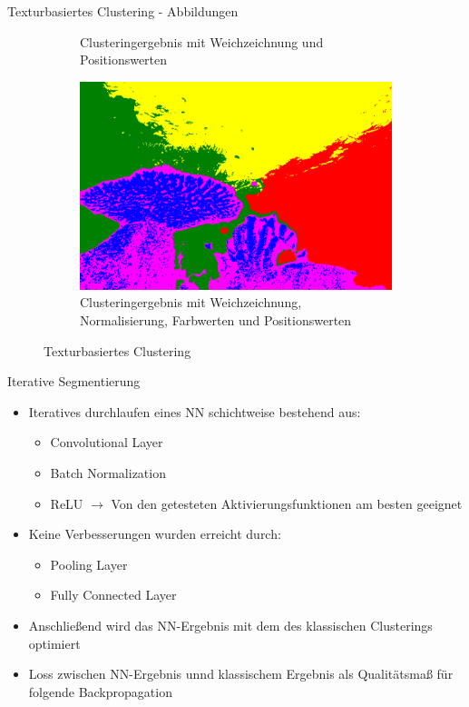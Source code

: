 \documentclass{beamer}
\begin{document}
\begin{frame}{Texturbasiertes Clustering - Abbildungen}
\begin{figure}
\begin{subfigure}[t]{.3\textwidth}
			\caption{Clusteringergebnis mit Weichzeichnung und Positionswerten}
		\end{subfigure}
		\hfill
		\begin{subfigure}[t]{.3\textwidth}
			\includegraphics[width=\textwidth,keepaspectratio]{gfx/101027.jpg_blur_norm_spatial_color.png}
			\caption{Clusteringergebnis mit Weichzeichnung, Normalisierung, Farbwerten und Positionswerten}
		\end{subfigure}
		\caption{Texturbasiertes Clustering}
	\end{figure}
\end{frame}

\begin{frame}{Iterative Segmentierung}
	\begin{itemize}
		\item Iteratives durchlaufen eines NN schichtweise bestehend aus:
		\begin{itemize}
			\item Convolutional Layer
			\item Batch Normalization
			\item ReLU $\rightarrow$ Von den getesteten Aktivierungsfunktionen am besten geeignet
		\end{itemize}
		\item Keine Verbesserungen wurden erreicht durch:
		\begin{itemize}
			\item Pooling Layer
			\item Fully Connected Layer
		\end{itemize}
		\medskip
		\item Anschließend wird das NN-Ergebnis mit dem des klassischen Clusterings optimiert
		\item Loss zwischen NN-Ergebnis unnd klassischem Ergebnis als Qualitätsmaß für folgende Backpropagation
	\end{itemize}
\end{frame}
\end{document}
